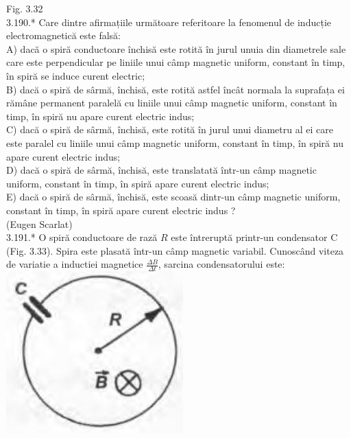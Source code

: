 \documentclass[10pt]{article}
\begin{document}
Fig. 3.32\\
3.190.* Care dintre afirmațiile următoare referitoare la fenomenul de inducție electromagnetică este falsă:\\
A) dacă o spiră conductoare închisă este rotită în jurul unuia din diametrele sale care este perpendicular pe liniile unui câmp magnetic uniform, constant în timp, în spiră se induce curent electric;\\
B) dacă o spiră de sârmă, închisă, este rotită astfel încât normala la suprafața ei rămâne permanent paralelă cu liniile unui câmp magnetic uniform, constant în timp, în spiră nu apare curent electric indus;\\
C) dacă o spiră de sârmă, închisă, este rotită în jurul unui diametru al ei care este paralel cu liniile unui câmp magnetic uniform, constant în timp, în spiră nu apare curent electric indus;\\
D) dacă o spiră de sârmă, închisă, este translatată într-un câmp magnetic uniform, constant în timp, în spiră apare curent electric indus;\\
E) dacă o spiră de sârmă, închisă, este scoasă dintr-un câmp magnetic uniform, constant în timp, în spiră apare curent electric indus ?\\
(Eugen Scarlat)\\
3.191.* O spiră conductoare de rază $R$ este întreruptă printr-un condensator C (Fig. 3.33). Spira este plasată într-un câmp magnetic variabil. Cunoscând viteza de variatie a inductiei magnetice $\frac{\Delta B}{\Delta t}$, sarcina condensatorului este:\\
\includegraphics[max width=\textwidth, center]{2025_07_01_5b3ff9fa0d508c8e9f17g-188}
\end{document}
